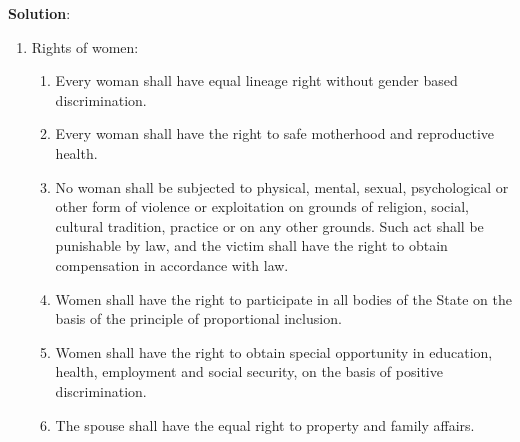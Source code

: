 \documentclass[
  openany]{book}
\newenvironment{solution}{ {\bfseries Solution}:}{}
\begin{document}
\begin{questions}
\begin{solution}
\begin{enumerate}
\item Rights of women:
\begin{enumerate}
\item Every woman shall have equal lineage right without gender based discrimination.
\item Every woman shall have the right to safe motherhood and reproductive health.
\item No woman shall be subjected to physical, mental, sexual, psychological or other form of violence or exploitation on grounds of religion, social, cultural tradition, practice or on any other grounds. Such act shall be punishable by law, and the victim shall have the right to obtain compensation in accordance with law.
\item Women shall have the right to participate in all bodies of the State on the basis of the principle of proportional inclusion.
\item Women shall have the right to obtain special opportunity in education, health, employment and social security, on the basis of positive discrimination.
\item The spouse shall have the equal right to property and family affairs.
\end{enumerate}


\end{enumerate}
\end{solution}
\end{questions}
\end{document}
